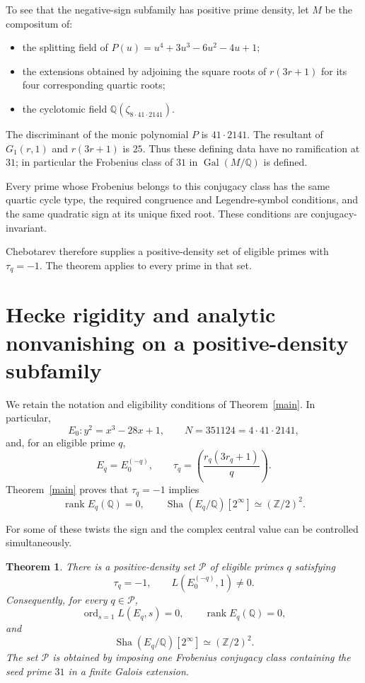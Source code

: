 \documentclass[11pt]{article}
\newtheorem{theorem}{Theorem}
\newcommand{\Q}{\mathbb Q}
\newcommand{\Sha}{\mathop{\mathrm{Sha}}}
\begin{document}
To see that the negative-sign subfamily has
positive prime density, let $M$ be the compositum of:

\begin{itemize}
\item the splitting field of
$P(u)=u^4+3u^3-6u^2-4u+1$;
\item the extensions obtained by adjoining the
square roots of $r(3r+1)$ for its four corresponding
quartic roots;
\item the cyclotomic field
$\Q(\zeta_{8\cdot41\cdot2141})$.
\end{itemize}

The discriminant of the monic polynomial $P$ is $41\cdot2141$.
The resultant of $G_1(r,1)$ and $r(3r+1)$ is $25$.
Thus these defining data have no ramification
at $31$; in particular the Frobenius class of
$31$ in $\operatorname{Gal}(M/\Q)$ is defined.

Every prime whose Frobenius belongs to this
conjugacy class has the same quartic cycle type,
the required congruence and Legendre-symbol
conditions, and the same quadratic sign at its
unique fixed root. These conditions are
conjugacy-invariant.

Chebotarev therefore supplies a positive-density
set of eligible primes with $\tau_q=-1$.
The theorem applies to every prime in that set.

\section{Hecke rigidity and analytic nonvanishing on a
positive-density subfamily}
\label{sec:analytic-nonvanishing}

We retain the notation and eligibility conditions of
Theorem~\ref{main}. In particular,
\[
E_0:y^2=x^3-28x+1,\qquad
N=351124=4\cdot41\cdot2141,
\]
and, for an eligible prime $q$,
\[
E_q=E_0^{(-q)},\qquad
\tau_q=\left(\frac{r_q(3r_q+1)}q\right).
\]
Theorem~\ref{main} proves that $\tau_q=-1$ implies
\[
\operatorname{rank}E_q(\mathbb Q)=0,\qquad
\Sha(E_q/\mathbb Q)[2^\infty]\simeq(\mathbb Z/2)^2.
\]

For some of these twists the sign and the complex central value
can be controlled simultaneously.

\begin{theorem}\label{thm:positive-density-analytic}
There is a positive-density set $\mathcal P$ of
eligible primes $q$ satisfying
\[
\tau_q=-1,\qquad L(E_0^{(-q)},1)\ne0.
\]
Consequently, for every $q\in\mathcal P$,
\[
\operatorname{ord}_{s=1}L(E_q,s)=0,\qquad
\operatorname{rank}E_q(\mathbb Q)=0,
\]
and
\[
\Sha(E_q/\mathbb Q)[2^\infty]
\simeq(\mathbb Z/2)^2.
\]
The set $\mathcal P$ is obtained by imposing one
Frobenius conjugacy class containing the seed prime
$31$ in a finite Galois extension.
\end{theorem}
\end{document}
